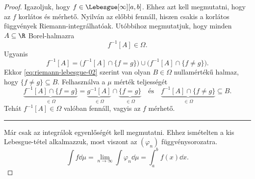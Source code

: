 \documentclass[
]{elteikthesis}[2024/04/26]
\begin{document}
\begin{proof}
		Igazoljuk, hogy \( f \in \Lebesgue[\infty][a, b] \).
		Ehhez azt kell megmutatni, hogy az \( f \) korlátos és mérhető.
		Nyilván az előbbi fennáll, hiszen csakis a korlátos függvények Riemann-integrálhatóak.
		Utóbbihoz megmutatjuk, hogy minden \( A \subseteq \R \) Borel-halmazra
		\[
			f^{-1}[A] \in \Omega.
		\]
		Ugyanis
		\[
			f^{-1}[A] =
			\bigl( f^{-1}[A] \cap \{ f = g \} \bigr) \cup 
			\bigl( f^{-1}[A] \cap \{ f \neq g \} \bigr).
		\]
		Ekkor \eqref{eq:riemann-lebesgue-02} szerint van olyan 
		\( B \in \Omega \) nullamértékű halmaz, 
		hogy \( \{ f \neq g \} \subseteq B \).
		Felhasználva a \( \mu \) mérték teljességét
		\[
			\underbrace{f^{-1}[A] \cap \{ f = g \}}_{\in \Omega} =
			\underbrace{g^{-1}[A]}_{\in \Omega} \cap \underbrace{\{ f = g \}}_{\in \Omega}
			\quad \text{és} \quad
			\underbrace{f^{-1}[A] \cap \{ f \neq g \}}_{\in \Omega} \subseteq B.
		\]
		Tehát \( f^{-1}[A] \in \Omega \) valóban fennáll, vagyis az \( f \) mérhető.

		\vspace{6pt}
		\hrule
		\vspace{9pt}

		Már csak az integrálok egyenlőségét kell megmutatni.
		Ehhez ismételten a kis Lebesgue-tétel alkalmazzuk, 
		most viszont az \( (\varphi_n) \) függvénysorozatra.
		\[
			\int f \dd{\mu} =
			\lim_{n \to \infty} \int \varphi_n \dd{\mu} =
			\int_a^b f(x) \dd{x}.
		\]
	\end{proof}
	
\end{document}
